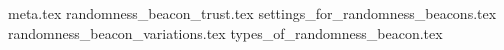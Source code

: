 {meta.tex}
{randomness_beacon_trust.tex}
{settings_for_randomness_beacons.tex}
{randomness_beacon_variations.tex}
{types_of_randomness_beacon.tex}
